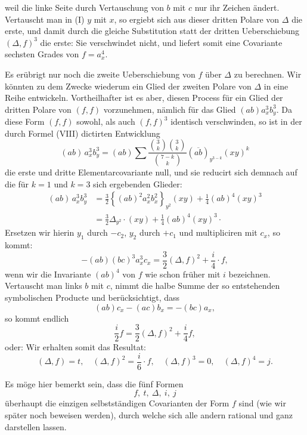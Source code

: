 weil die linke Seite durch Vertauschung von $b$ mit $c$ nur ihr Zeichen \"andert. Vertauscht man in (I) $y$ mit $x$, so ergiebt sich aus dieser dritten Polare von $\Delta$ die erste, und damit durch die gleiche Substitution statt der dritten Ueberschiebung $(\Delta, f)^3$ die erste:
Sie verschwindet nicht, und liefert somit eine Covariante sechsten Grades von $f = a_x^4$.

Es er\"ubrigt nur noch die zweite Ueberschiebung von $f$ \"uber $\Delta$ zu berechnen. Wir k\"onnten zu dem Zwecke wiederum ein Glied der zweiten Polare von $\Delta$ in eine Reihe entwickeln. Vortheilhafter ist es aber, diesen Process f\"ur ein Glied der dritten Polare von $(f,f)$ vorzunehmen, n\"amlich f\"ur das Glied $(ab)a_x^3 b_y^3$. Da diese Form $(f,f)$ sowohl, als auch $(f,f)^3$ identisch verschwinden, so ist in der durch Formel (VIII) dictirten Entwicklung
\[
(ab)\,a_x^3 b_y^3 = (ab) \sum \frac{\binom{3}{k}\binom{3}{k}}{\binom{7-k}{k}} (\overline{ab})_{y^{3-k}} (xy)^k
\]
die erste und dritte Elementarcovariante null, und sie reducirt sich demnach auf die f\"ur $k=1$ und $k=3$ sich ergebenden Glieder:
\[
\begin{aligned}
(ab)\,a_x^3 b_y^3 &= \frac{3}{2}\left\{(ab)^2 a_x^2 b_x^2\right\}_{y^2} (xy) + \frac{1}{4}(ab)^4 (xy)^3 \\
&= \frac{3}{2}\Delta_{y^2}\cdot (xy) + \frac{1}{4}(ab)^4 (xy)^3\cdot
\end{aligned}
\]
Ersetzen wir hierin $y_1$ durch $-c_2$, $y_2$ durch $+c_1$ und multipliciren mit $c_x$, so kommt:
\[
-(ab)(bc)^3 a_x^3 c_x = \frac{3}{2}(\Delta, f)^2 + \frac{i}{4} \cdot f,
\]
wenn wir die Invariante $(ab)^4$ von $f$ wie schon fr\"uher mit $i$ bezeichnen. Vertauscht man links $b$ mit $c$, nimmt die halbe Summe der so entstehenden symbolischen Producte und ber\"ucksichtigt, dass
\[
(ab)c_x - (ac)b_x = -(bc)a_x,
\]
so kommt endlich
\[
\frac{i}{2} f = \frac{3}{2}(\Delta, f)^2 + \frac{i}{4} f,
\]
oder:
Wir erhalten somit das Resultat:
\[
(\Delta, f) = t, \quad (\Delta, f)^2 = \frac{i}{6} \cdot f, \quad (\Delta, f)^3 = 0, \quad (\Delta, f)^4 = j.
\]


Es möge hier bemerkt sein, dass die fünf Formen
\[
f,\ t,\ \Delta,\ i,\ j
\]
überhaupt die einzigen selbstständigen Covarianten der Form $f$ sind (wie wir später noch beweisen werden), durch welche sich alle andern rational und ganz darstellen lassen.

